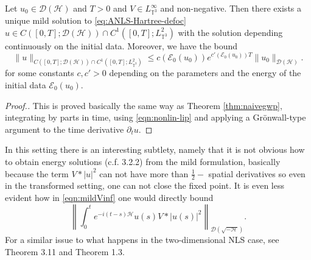 \begin{thm}
  \label{thm:Vinfdomain}Let $u_0 \in \mathcal{D} (\mathcal{H})$ and $T > 0$
  and $V \in L_{\mathbb{T}^3}^{\infty} $ and non-negative. Then there exists a
  unique mild solution to \eqref{eq:ANLS-Hartree-defoc} $u \in C ([0, T] ; \mathcal{D} (\mathcal{H})) \cap C^1 ([0, T] ;
     L_{\mathbb{T}^3}^2)$
  with the solution depending continuously on the initial data. Moreover, we have the bound
  \begin{equation}
    \| u \|_{C ([0, T] ; \mathcal{D} (\mathcal{H})) \cap C^1 ([0, T] ;
    L_{\mathbb{T}^3}^2)} \leqslant c (\mathcal{E}_0 (u_0)) e^{c'
    (\mathcal{E}_0 (u_0)) T} \| u_0 \|_{\mathcal{D} (\mathcal{H})} .
    \label{eq:bd-Vinf-domain}
  \end{equation}
for some constants $c, c' > 0$ depending on the parameters and the energy of the
  initial data $\mathcal{E}_0 (u_0)$.
\end{thm}

\begin{proof}[Proof.]
  This is proved basically the same way as Theorem \ref{thm:naivegwp},
  integrating by parts in time, using \eqref{eqn:nonlin-lip} and applying a
  Gr\"onwall-type argument to the time derivative $\partial_t u$.
\end{proof}

In this setting there is an interesting subtlety, namely that it is not
obvious how to obtain energy solutions (c.f. {\cite{GUZ20}} 3.2.2)
from the mild formulation, basically because the term $V \ast | u |^2$ can not
have more than $\frac{1}{2} -$ spatial derivatives so even in the transformed
setting, one can not close the fixed point. It is even less evident how in
\eqref{eqn:mildVinf} one would directly bound
\[ \left\| \int^t_0 e^{- i (t - s) \mathcal{H}} u (s) V \ast | u (s) |^2
   \right\|_{\mathcal{D} \left( \sqrt{- \mathcal{H}} \right)} . \]
For a similar issue to what happens in the two-dimensional NLS case, see
{\cite{GUZ20}} Theorem 3.11 and {\cite{Z19}} Theorem 1.3.

